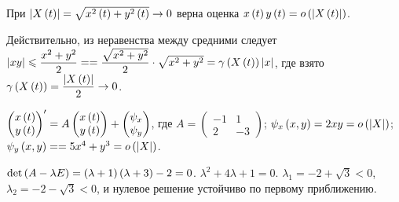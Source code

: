 \documentclass[a5paper,10pt]{article}
\begin{document}
\begin{framed}
    \begin{proposition}
    При $\left|X\left(t\right)\right| = \sqrt{x^2\left(t\right) + y^2\left(t\right)} \to 0$ верна оценка $x\left(t\right) y\left(t\right) = o\left(\left|X\left(t\right)\right|\right)$.
    \end{proposition}
    
    Действительно, из неравенства между средними следует $\vbr{xy} \le \dfrac {x^2 + y^2} {2} = \linebreak =  \dfrac {\sqrt{x^2 + y^2}} {2} \cdot \sqrt{x^2 + y^2} = \gamma\br{X\br{t}} \vbr{x} $, где взято $\gamma\left(X\left(t\right)\right) = \dfrac {\left|X\left(t\right)\right|} {2} \to 0$.
\end{framed}

$\begin{pmatrix}x\left(t\right) \\ y\left(t\right)\end{pmatrix}' = A \begin{pmatrix}x\left(t\right) \\ y\left(t\right)\end{pmatrix} + \begin{pmatrix}\psi_{x} \\ \psi_{y} \end{pmatrix}$, где $A = \begin{pmatrix} -1 & 1 \\ 2 & -3 \end{pmatrix}$;
$\psi_{x}\left(x, y\right) = 2xy = o\left(\left|X\right|\right)$;
$\psi_{y}\br{x, y} = \linebreak =  5x^{4} + y^{3} = o\br{\vbr{X}}$.

$\det \left(A - \lambda E\right) = \left(\lambda + 1\right) \left(\lambda + 3\right) - 2 = 0$.
$\lambda^2 + 4 \lambda + 1 = 0$. $\lambda_{1} = -2 + \sqrt{3} < 0$, $\lambda_{2} = -2 - \sqrt{3} < 0$, и нулевое решение устойчиво по первому приближению.
\end{document}
